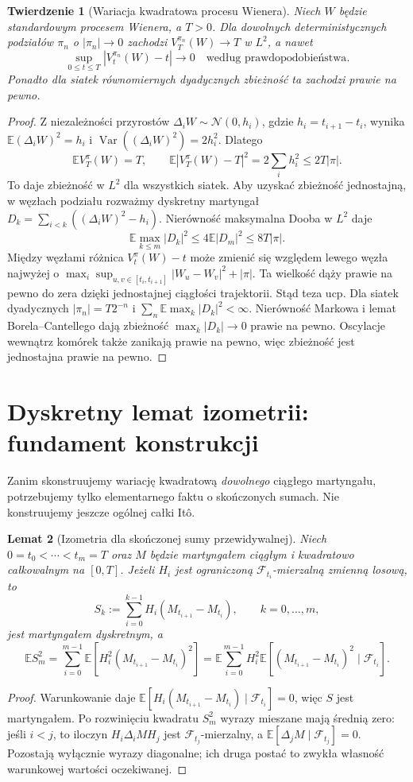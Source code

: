 \documentclass[11pt,a4paper,oneside]{report}
\numberwithin{equation}{chapter}
\theoremstyle{plain}
\newtheorem{twierdzenie}{Twierdzenie}[chapter]
\newtheorem{lemat}[twierdzenie]{Lemat}
\theoremstyle{definition}
\theoremstyle{remark}
\newcommand{\E}{\mathbb{E}}
\newcommand{\Var}{\operatorname{Var}}
\newcommand{\calF}{\mathcal{F}}
\newcommand{\Normal}{\mathcal{N}}
\begin{document}
\begin{twierdzenie}[Wariacja kwadratowa procesu Wienera]
\label{thm:brownian-bracket}
Niech $W$ będzie standardowym procesem Wienera,
a $T>0$. Dla dowolnych deterministycznych podziałów
$\pi_n$ o $|\pi_n|\to0$ zachodzi
$V_T^{\pi_n}(W)\to T$ w $L^2$, a nawet
\[
\sup_{0\le t\le T}|V_t^{\pi_n}(W)-t|
\longrightarrow0
\quad\text{według prawdopodobieństwa}.
\]
Ponadto dla siatek równomiernych dyadycznych
zbieżność ta zachodzi prawie na pewno.
\end{twierdzenie}
\begin{proof}
Z niezależności przyrostów $\Delta_iW\sim
\Normal(0,h_i)$, gdzie $h_i=t_{i+1}-t_i$,
wynika $\E(\Delta_iW)^2=h_i$ i
$\Var((\Delta_iW)^2)=2h_i^2$.
Dlatego
\[
\E V_T^\pi(W)=T,\qquad
\E|V_T^\pi(W)-T|^2=2\sum_i h_i^2
\le2T|\pi|.
\]
To daje zbieżność w $L^2$ dla wszystkich siatek.
Aby uzyskać zbieżność jednostajną, w węzłach podziału
rozważmy dyskretny martyngał
$D_k=\sum_{i<k}((\Delta_iW)^2-h_i)$.
Nierówność maksymalna Dooba w $L^2$ daje
\[
\E\max_{k\le m}|D_k|^2\le4\E|D_m|^2
\le8T|\pi|.
\]
Między węzłami różnica $V_t^\pi(W)-t$ może
zmienić się względem lewego węzła najwyżej o
$\max_i\sup_{u,v\in[t_i,t_{i+1}]}|W_u-W_v|^2+|\pi|$.
Ta wielkość dąży prawie na pewno do zera dzięki
jednostajnej ciągłości trajektorii. Stąd teza ucp.
Dla siatek dyadycznych $|\pi_n|=T2^{-n}$
i $\sum_n\E\max_k|D_k|^2<\infty$.
Nierówność Markowa i lemat Borela--Cantellego dają
zbieżność $\max_k|D_k|\to0$ prawie na pewno.
Oscylacje wewnątrz komórek także zanikają prawie na pewno,
więc zbieżność jest jednostajna prawie na pewno.
\end{proof}

\section{Dyskretny lemat izometrii: fundament konstrukcji}
Zanim skonstruujemy wariację kwadratową \emph{dowolnego}
ciągłego martyngału, potrzebujemy tylko elementarnego
faktu o skończonych sumach. Nie konstruujemy jeszcze
ogólnej całki Itô.

\begin{lemat}[Izometria dla skończonej sumy przewidywalnej]
\label{lem:discrete-isometry}
Niech $0=t_0<\cdots<t_m=T$ oraz
$M$ będzie martyngałem ciągłym i kwadratowo całkowalnym
na $[0,T]$. Jeżeli $H_i$ jest ograniczoną
$\calF_{t_i}$-mierzalną zmienną losową, to
\[
S_k:=\sum_{i=0}^{k-1}H_i(M_{t_{i+1}}-M_{t_i}),
\qquad k=0,\ldots,m,
\]
jest martyngałem dyskretnym, a
\[
\E S_m^2
=\sum_{i=0}^{m-1}\E[H_i^2(M_{t_{i+1}}-M_{t_i})^2]
=\E\sum_{i=0}^{m-1}H_i^2
\E[(M_{t_{i+1}}-M_{t_i})^2\mid\calF_{t_i}].
\]
\end{lemat}
\begin{proof}
Warunkowanie daje
$\E[H_i(M_{t_{i+1}}-M_{t_i})\mid\calF_{t_i}]=0$,
więc $S$ jest martyngałem. Po rozwinięciu kwadratu
$S_m^2$ wyrazy mieszane mają średnią zero:
jeśli $i<j$, to iloczyn
$H_i\Delta_iM H_j$ jest $\calF_{t_j}$-mierzalny,
a $\E[\Delta_jM\mid\calF_{t_j}]=0$.
Pozostają wyłącznie wyrazy diagonalne; ich druga
postać to zwykła własność warunkowej wartości oczekiwanej.
\end{proof}
\end{document}
